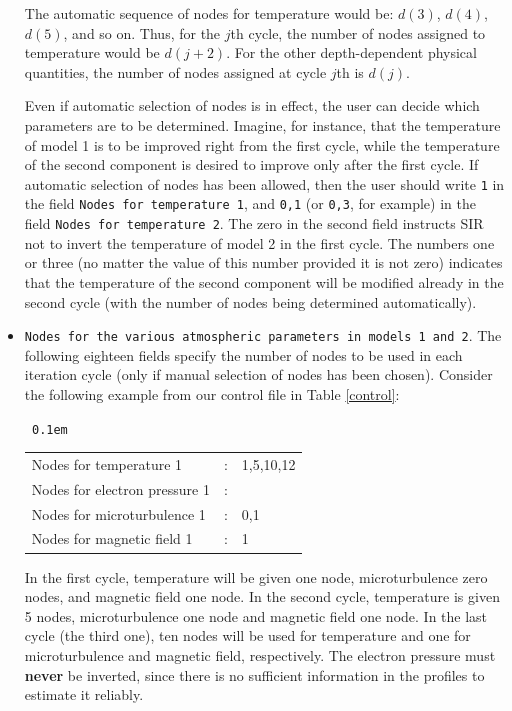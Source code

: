 \documentclass[11pt]{report}
\begin{document}
\begin{itemize}
The automatic sequence of nodes for temperature would be: $d(3)$,
$d(4)$, $d(5)$, and so on. Thus, for the $j$th cycle, the number of
nodes assigned to temperature would be $d(j+2)$. For the other
depth-dependent physical quantities, the number of nodes assigned 
at cycle $j$th is $d(j)$.

Even if automatic selection of nodes is in effect, the user can decide
which parameters are to be determined. Imagine, for instance, that the
temperature of model 1 is to be improved right from the first cycle,
while the temperature of the second component is desired to improve
only after the first cycle. If automatic selection of nodes has been
allowed, then the user should write {\tt 1} in the field {\tt Nodes for
temperature 1}, and {\tt 0,1} (or {\tt 0,3}, for example) in the field
{\tt Nodes for temperature 2}. The zero in the second field instructs
SIR not to invert the temperature of model 2 in the first cycle. The
numbers one or three (no matter the value of this number provided it is
not zero) indicates that the temperature of the second component will
be modified already in the second cycle (with the number of nodes being
determined automatically).

\item {\tt Nodes for the various atmospheric parameters in models 1 and 2}. The
following eighteen fields specify the number of nodes to be 
used in each iteration cycle (only if manual selection of nodes has
been chosen). Consider the following example from our control file in
Table \ref{control}:
\begin{flushleft}
\tt 
\tabcolsep 0.1em
\begin{tabular}{lcl}
Nodes for temperature 1    &:&1,5,10,12         \\
Nodes for electron pressure 1 &:&                  \\
Nodes for microturbulence 1     &:&0,1               \\
Nodes for magnetic field 1 &:&1	
\end{tabular}
\end{flushleft}
In the first cycle, temperature will be given one node, microturbulence
zero nodes, and magnetic field one node. In the second cycle,
temperature is given 5 nodes, microturbulence one node and magnetic
field one node. In the last cycle (the third one), ten nodes will be
used for temperature and one for microturbulence and magnetic field,
respectively. The electron pressure must {\bf never} be inverted, since 
there is no sufficient information in the profiles to estimate it 
reliably. 


\end{itemize}
\end{document}
